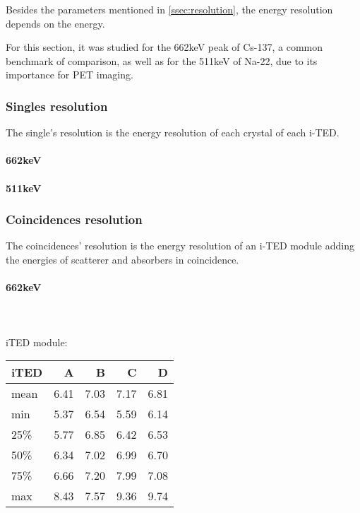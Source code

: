 Besides the parameters mentioned in \ref{ssec:resolution}, the energy resolution depends on the energy.

For this section, it was studied for the 662keV peak of Cs-137, a common benchmark of comparison, as well as for the 511keV of Na-22, due to its importance for PET imaging.

\subsubsection{Singles resolution}

The single's resolution is the energy resolution of each crystal of each i-TED.

\paragraph*{662keV}

\paragraph*{511keV}

\subsubsection{Coincidences resolution}

The coincidences' resolution is the energy resolution of an i-TED module adding the energies of scatterer and absorbers in coincidence.

\paragraph*{662keV}\\~\\

iTED module:\\

\begin{tabular}{lrrrr}
    \toprule
    iTED &    A &    B &    C &    D \\
    \midrule
    mean & 6.41 & 7.03 & 7.17 & 6.81 \\
    min  & 5.37 & 6.54 & 5.59 & 6.14 \\
    25\%  & 5.77 & 6.85 & 6.42 & 6.53 \\
    50\%  & 6.34 & 7.02 & 6.99 & 6.70 \\
    75\%  & 6.66 & 7.20 & 7.99 & 7.08 \\
    max  & 8.43 & 7.57 & 9.36 & 9.74 \\
    \bottomrule
\end{tabular}\\


